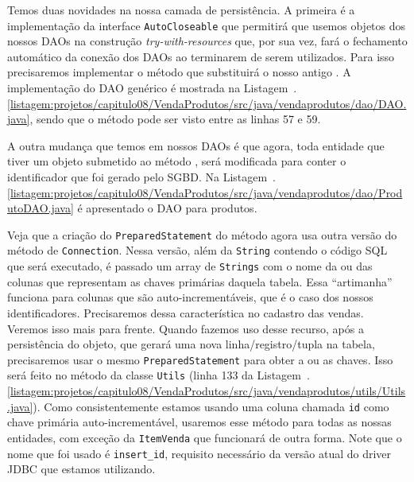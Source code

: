 Temos duas novidades na nossa camada de persistência. A primeira é a implementação da interface \texttt{AutoCloseable} que permitirá que usemos objetos dos nossos DAOs na construção \textit{try-with-resources} que, por sua vez, fará o fechamento automático da conexão dos DAOs ao terminarem de serem utilizados. Para isso precisaremos implementar o método  que substituirá o nosso antigo . A implementação do DAO genérico é mostrada na Listagem~\thechapter.\ref{listagem:projetos/capitulo08/VendaProdutos/src/java/vendaprodutos/dao/DAO.java}, sendo que o método  pode ser visto entre as linhas 57 e 59.


A outra mudança que temos em nossos DAOs é que agora, toda entidade que tiver um objeto submetido ao método , será modificada para conter o identificador que foi gerado pelo SGBD. Na Listagem~\thechapter.\ref{listagem:projetos/capitulo08/VendaProdutos/src/java/vendaprodutos/dao/ProdutoDAO.java} é apresentado o DAO para produtos.


Veja que a criação do \texttt{PreparedStatement} do método  agora usa outra versão do método  de \texttt{Connection}. Nessa versão, além da \texttt{String} contendo o código SQL que será executado, é passado um array de \texttt{Strings} com o nome da ou das colunas que representam as chaves primárias daquela tabela. Essa ``artimanha'' funciona para colunas que são auto-incrementáveis, que é o caso dos nossos identificadores. Precisaremos dessa característica no cadastro das vendas. Veremos isso mais para frente. Quando fazemos uso desse recurso, após a persistência do objeto, que gerará uma nova linha/registro/tupla na tabela, precisaremos usar o mesmo \texttt{PreparedStatement} para obter a ou as chaves. Isso será feito no método  da classe \texttt{Utils} (linha 133 da Listagem~\thechapter.\ref{listagem:projetos/capitulo08/VendaProdutos/src/java/vendaprodutos/utils/Utils.java}). Como consistentemente estamos usando uma coluna chamada \texttt{id} como chave primária auto-incrementável, usaremos esse método para todas as nossas entidades, com exceção da \texttt{ItemVenda} que funcionará de outra forma. Note que o nome que foi usado é \texttt{insert\_id}, requisito necessário da versão atual do driver JDBC que estamos utilizando.


